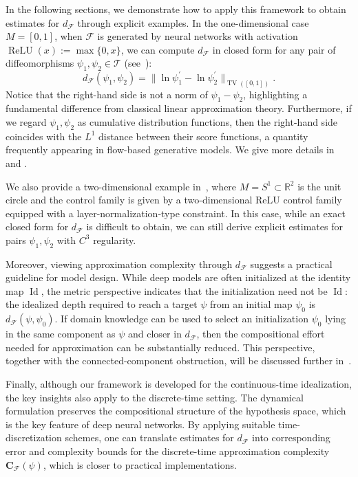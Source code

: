 \documentclass[12pt]{amsart}
\numberwithin{equation}{section}
\theoremstyle{remark}
\begin{document}
In the following sections, we demonstrate how to apply this framework to obtain estimates for $d_{\mathcal F}$
through explicit examples. In the one-dimensional case $M=[0,1]$, when $\mathcal F$ is generated by neural
networks with activation $\operatorname{ReLU}(x):=\max\{0,x\}$, we can compute $d_{\mathcal F}$ in closed form
for any pair of diffeomorphisms $\psi_1,\psi_2\in\mathcal T$ (see~):
\begin{equation}
d_{\mathcal F}(\psi_1,\psi_2)=\|\ln \psi_1^{\prime}-\ln \psi_2^\prime \|_{\operatorname{TV}([0,1])}.
\end{equation}
Notice that the right-hand side is not a norm of $\psi_1-\psi_2$, highlighting a fundamental difference from
classical linear approximation theory. Furthermore, if we regard $\psi_1,\psi_2$ as cumulative distribution
functions, then the right-hand side coincides with the $L^1$ distance between their score functions, a quantity
frequently appearing in flow-based generative models. We give more details in~ and
.

We also provide a two-dimensional example in~, where $M=S^1\subset\mathbb{R}^2$ is the
unit circle and the control family is given by a two-dimensional ReLU control family equipped with a
layer-normalization-type constraint. In this case, while an exact closed form for $d_{\mathcal F}$ is difficult to
obtain, we can still derive explicit estimates for pairs $\psi_1,\psi_2$ with $C^3$ regularity.

Moreover, viewing approximation complexity through $d_{\mathcal F}$ suggests a practical guideline for model
design. While deep models are often initialized at the identity map $\operatorname{Id}$, the metric perspective
indicates that the initialization need not be $\operatorname{Id}$: the idealized depth required to reach a target
$\psi$ from an initial map $\psi_0$ is $d_{\mathcal F}(\psi,\psi_0)$. If domain knowledge can be used to select an
initialization $\psi_0$ lying in the same component as $\psi$ and closer in $d_{\mathcal F}$, then the
compositional effort needed for approximation can be substantially reduced. This perspective, together with
the connected-component obstruction, will be discussed further in~.

Finally, although our framework is developed for the continuous-time idealization, the key insights also apply
to the discrete-time setting. The dynamical formulation preserves the compositional structure of the hypothesis
space, which is the key feature of deep neural networks. By applying suitable time-discretization schemes, one
can translate estimates for $d_{\mathcal F}$ into corresponding error and complexity bounds for the discrete-time
approximation complexity $\mathbf C_{\mathcal F}(\psi)$, which is closer to practical implementations.
\end{document}
